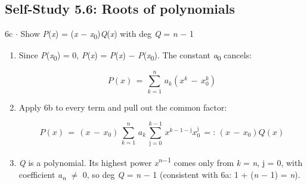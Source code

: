 \documentclass[11pt]{article}
\begin{document}
\begin{keepsection}\subsection{Self-Study 5.6: Roots of polynomials}

\begin{workedbox}{6c \ensuremath{\cdot} Show \textit{P}(\textit{x}) = (\textit{x} \ensuremath{-} \textit{x}\textsubscript{0})\textit{Q}(\textit{x}) with deg \textit{Q} = \textit{n} \ensuremath{-} 1}
\begin{enumerate}
\item {}
Since \textit{P}(\textit{x}\textsubscript{0}) = 0, \textit{P}(\textit{x}) = \textit{P}(\textit{x}) \ensuremath{-} \textit{P}(\textit{x}\textsubscript{0}). The constant \textit{a}\textsubscript{0} cancels:

\begin{equation*}{P}({x})\, =\, \sum_{{k}=1}^{{n}} \, {a}_{{k}}({x}^{{k}}\, -\, {x}_{0}^{{k}})\end{equation*}
\item {}
Apply 6b to every term and pull out the common factor:

\begin{equation*}{P}({x})\, =\, ({x}\, -\, {x}_{0})\, \sum_{{k}=1}^{{n}} \, {a}_{{k}}\, \sum_{\mathrm{j}=0}^{{k}-1} \, {x}^{{k}-1-\mathrm{j}}{x}_{0}^{\mathrm{j}}\, =:\, ({x}\, -\, {x}_{0}){Q}({x})\end{equation*}
\item \textit{Q} is a polynomial. Its highest power \textit{x}\textsuperscript{\textit{n}\ensuremath{-}1} comes only from \textit{k} = \textit{n}, j = 0, with coefficient \textit{a}\textsubscript{\textit{n}} \ensuremath{\neq} 0, so deg \textit{Q} = \textit{n} \ensuremath{-} 1 (consistent with 6a: 1 + (\textit{n} \ensuremath{-} 1) = \textit{n}).
\end{enumerate}
\end{workedbox}

\end{keepsection}
\end{document}
